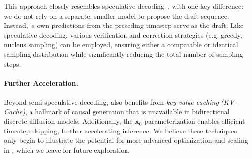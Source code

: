This approach closely resembles speculative decoding~\citep{leviathan2023fast}, with one key difference: we do not rely on a separate, smaller model to propose the draft sequence. Instead, \method{}’s own predictions from the preceding timestep serve as the draft. Like speculative decoding, various verification and correction strategies (e.g. greedy, nucleus sampling) can be employed, ensuring either a comparable or identical sampling distribution while significantly reducing the total number of sampling steps.



\paragraph{Further Acceleration.}
Beyond semi-speculative decoding, \method{} also benefits from \textit{key-value caching (KV-Cache)}, a hallmark of causal generation that is unavailable in bidirectional discrete diffusion models. Additionally, the \(\textbf{x}_0\)-parameterization enables efficient timestep skipping, further accelerating inference. We believe these techniques only begin to illustrate the potential for more advanced optimization and scaling in \method{}, which we leave for future exploration.






